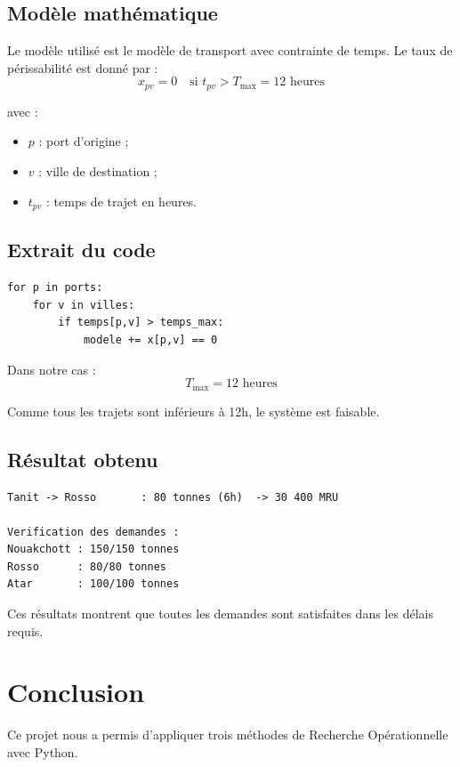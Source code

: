 \documentclass[12pt,a4paper]{article}
\begin{document}
\subsection{Modèle mathématique}

Le modèle utilisé est le modèle de transport avec contrainte
de temps. Le taux de périssabilité est donné par :
\[
x_{pv} = 0 \quad \text{si } t_{pv} > T_{\max} = 12 \text{ heures}
\]

avec :
\begin{itemize}
  \item $p$ : port d'origine ;
  \item $v$ : ville de destination ;
  \item $t_{pv}$ : temps de trajet en heures.
\end{itemize}

\subsection{Extrait du code}

\begin{lstlisting}
for p in ports:
    for v in villes:
        if temps[p,v] > temps_max:
            modele += x[p,v] == 0
\end{lstlisting}

Dans notre cas :
\[
T_{\max} = 12 \text{ heures}
\]

Comme tous les trajets sont inférieurs à 12h, le système
est faisable.

\subsection{Résultat obtenu}

\begin{lstlisting}
Tanit -> Rosso       : 80 tonnes (6h)  -> 30 400 MRU

Verification des demandes :
Nouakchott : 150/150 tonnes
Rosso      : 80/80 tonnes
Atar       : 100/100 tonnes
\end{lstlisting}

Ces résultats montrent que toutes les demandes sont satisfaites
dans les délais requis.

\section{Conclusion}

Ce projet nous a permis d'appliquer trois méthodes de Recherche
Opérationnelle avec Python.
\end{document}
